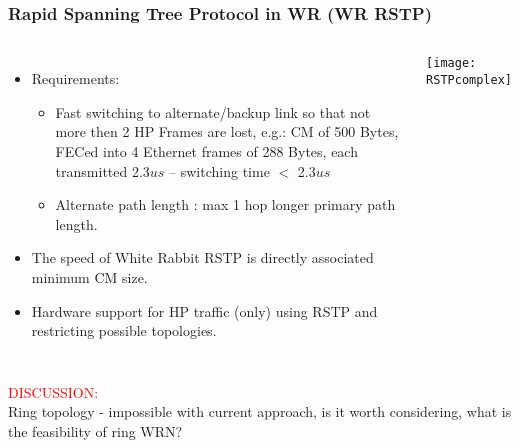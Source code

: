\documentclass[]{beamer}
\begin{document}
\begin{frame}
  \frametitle{Rapid Spanning Tree Protocol in WR (WR RSTP)}
  
  \begin{columns}[c]
  \column{3.8in} 

  \begin{itemize}
  \item Requirements:
  \begin{itemize}
    \item Fast switching to alternate/backup link so that not more then 2 HP
          Frames are lost, e.g.: CM of 500 Bytes, FECed into 4 Ethernet frames
          of 288 Bytes, each transmitted 2.3$us$ -- switching time $<$ 2.3$us$
    \item Alternate path length : max 1 hop longer primary path length.
  \end{itemize}
  \item The speed of White Rabbit RSTP is directly associated minimum CM size.
  \item Hardware support for HP traffic (only) using RSTP and restricting
        possible topologies.
  \end{itemize}

  \column{1.2in}

  \centering
  \texttt{[image: RSTPcomplex]}

  \end{columns}
\centering
\textcolor{red}{DISCUSSION:} \\
Ring topology - impossible with current approach, is it worth considering, what
is the feasibility of ring WRN?

\end{frame}
\end{document}
